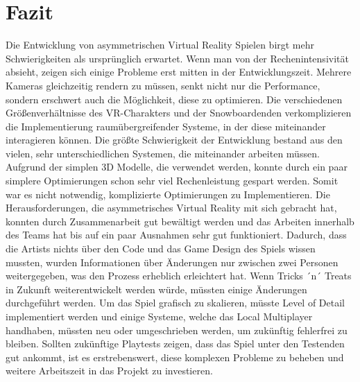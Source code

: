 \chapter{Fazit}
Die Entwicklung von asymmetrischen Virtual Reality Spielen birgt mehr Schwierigkeiten als ursprünglich erwartet. Wenn man von der Rechenintensivität absieht, zeigen sich einige Probleme erst mitten in der Entwicklungszeit. Mehrere Kameras gleichzeitig rendern zu müssen, senkt nicht nur die Performance, sondern erschwert auch die Möglichkeit, diese zu optimieren. Die verschiedenen Größenverhältnisse des VR-Charakters und der Snowboardenden verkomplizieren die Implementierung raumübergreifender Systeme, in der diese miteinander interagieren können. Die größte Schwierigkeit der Entwicklung bestand aus den vielen, sehr unterschiedlichen Systemen, die miteinander arbeiten müssen. Aufgrund der simplen 3D Modelle, die verwendet werden, konnte durch ein paar simplere Optimierungen schon sehr viel Rechenleistung gespart werden. Somit war es nicht notwendig, komplizierte Optimierungen zu Implementieren. Die Herausforderungen, die asymmetrisches Virtual Reality mit sich gebracht hat, konnten durch Zusammenarbeit gut bewältigt werden und das Arbeiten innerhalb des Teams hat bis auf ein paar Ausnahmen sehr gut funktioniert. Dadurch, dass die Artists nichts über den Code und das Game Design des Spiels wissen mussten, wurden Informationen über Änderungen nur zwischen zwei Personen weitergegeben, was den Prozess erheblich erleichtert hat. Wenn Tricks ´n´ Treats in Zukunft weiterentwickelt werden würde, müssten einige Änderungen durchgeführt werden. Um das Spiel grafisch zu skalieren, müsste Level of Detail implementiert werden und einige Systeme, welche das Local Multiplayer handhaben, müssten neu oder umgeschrieben werden, um zukünftig fehlerfrei zu bleiben. Sollten zukünftige Playtests zeigen, dass das Spiel unter den Testenden gut ankommt, ist es erstrebenswert, diese komplexen Probleme zu beheben und weitere Arbeitszeit in das Projekt zu investieren.
